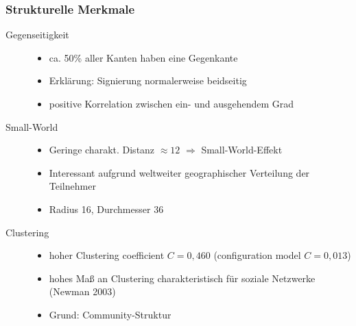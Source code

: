 \documentclass[10pt]{beamer}
\begin{document}
\begin{frame}
  \frametitle{Strukturelle Merkmale}
  \begin{description}
  \item[Gegenseitigkeit]
    \begin{itemize}
    \item ca. 50\% aller Kanten haben eine Gegenkante 
    \item Erkl\"arung: Signierung normalerweise beidseitig
    \item positive Korrelation zwischen ein- und ausgehendem Grad
    \end{itemize}
  \item[Small-World] 
    \begin{itemize}
    \item Geringe charakt. Distanz $\approx 12$ $\Rightarrow$
      Small-World-Effekt
      \item Interessant aufgrund weltweiter geographischer Verteilung der
        Teilnehmer
      \item Radius 16, Durchmesser 36
    \end{itemize}
  \item[Clustering] 
    \begin{itemize}
    \item hoher Clustering coefficient $C = 0,460$ (configuration
      model $C = 0,013$)
    \item hohes Ma{\ss} an Clustering charakteristisch f\"ur soziale
      Netzwerke (Newman 2003)
    \item Grund: Community-Struktur
    \end{itemize}
  \end{description}
\end{frame}
\end{document}
